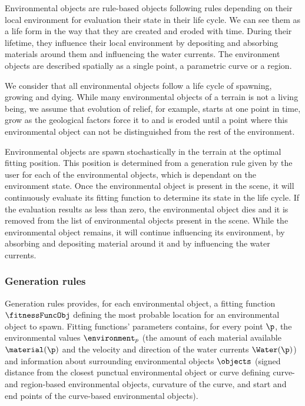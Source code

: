 Environmental objects are rule-based objects following rules depending on their local environment for evaluation their state in their life cycle. We can see them as a life form in the way that they are created and eroded with time. During their lifetime, they influence their local environment by depositing and absorbing materials around them and influencing the water currents. The environment objects are described spatially as a single point, a parametric curve or a region.

We consider that all environmental objects follow a life cycle of spawning, growing and dying. While many environmental objects of a terrain is not a living being, we assume that evolution of relief, for example, starts at one point in time, grow as the geological factors force it to and is eroded until a point where this environmental object can not be distinguished from the rest of the environment. 

Environmental objects are spawn stochastically in the terrain at the optimal fitting position. This position is determined from a generation rule given by the user for each of the environmental objects, which is dependant on the environment state.
Once the environmental object is present in the scene, it will continuously evaluate its fitting function to determine its state in the life cycle. If the evaluation results as less than zero, the environmental object dies and it is removed from the list of environmental objects present in the scene. While the environmental object remains, it will continue influencing its environment, by absorbing and depositing material around it and by influencing the water currents. 

\subsubsection{Generation rules}
\label{sec:semantic-representation_generation-rules}
Generation rules provides, for each environmental object, a fitting function $\fitnessFuncObj$ defining the most probable location for an environmental object to spawn. Fitting functions' parameters contains, for every point $\p$, the environmental values $\environment_p$ (the amount of each material available $\material(\p)$ and the velocity and direction of the water currents $\Water(\p)$) and information about surrounding environmental objects $\objects$ (signed distance from the closest punctual environmental object or curve defining curve- and region-based environmental objects, curvature of the curve, and start and end points of the curve-based environmental objects).

